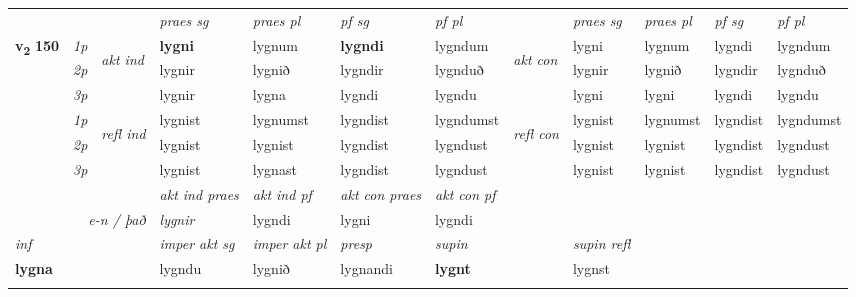 \begin{longtable}[l]{X>{\footnotesize\itshape}llXXXXlXXXX}
 & &   & \textit{praes sg}  & \textit{praes pl}    & \textit{ pf sg} & \textit{pf pl} & & \textit{praes sg}  & \textit{praes pl}    & \textit{pf sg} & \textit{pf pl }  \\ \cmidrule{4-7} \cmidrule{9-12}
 \multirow{2}{*}{{{\textbf{v{\textsubscript{2}}} \Large{\textbf{150}}}}}  & 1p & \multirow{3}{*}{\begin{turn}{90}\textit{akt ind}\end{turn}} & \textbf{lygni} & lygnum & \textbf{lygndi} & lygndum & \multirow{3}{*}{\begin{turn}{90}\textit{akt con}\end{turn}} &lygni & lygnum & lygndi & lygndum\\*
 & 2p &  &  lygnir  & lygnið & lygndir & lygnduð & & lygnir & lygnið & lygndir & lygnduð \\*
 & 3p &  & lygnir & lygna & lygndi & lygndu & & lygni & lygni& lygndi & lygndu \\*
\cmidrule{4-7} \cmidrule{9-12}
 & 1p & \multirow{3}{*}{\begin{turn}{90}\textit{refl ind}\end{turn}}  & lygnist & lygnumst & lygndist & lygndumst & \multirow{3}{*}{\begin{turn}{90}\textit{refl con}\end{turn}}  &lygnist & lygnumst & lygndist & lygndumst \\*
 & 2p &  & lygnist & lygnist & lygndist & lygndust & &lygnist & lygnist & lygndist & lygndust \\*
 & 3p  & & lygnist & lygnast & lygndist & lygndust & & lygnist & lygnist& lygndist & lygndust \\*
\cmidrule{4-7} \cmidrule{9-12}

   && &  \textit{akt ind praes} & \textit{akt ind pf} & \textit{akt con praes} & \textit{akt con pf} \\*
\multicolumn{3}{r}{\textit{e-n / það}} & lygnir & lygndi & lygni & lygndi \\*

\cmidrule{4-7}
   {\textit{inf}} & &  & \textit{imper akt sg} & \textit{imper akt pl}   & \textit{presp} & \textit{supin} && \textit{supin refl}  \\*
  {\textbf{lygna}} & && lygndu  & lygnið   & lygnandi &  \textbf{lygnt} && lygnst  \\*

\midrule
  & \\
   \midrule


\end{longtable}

